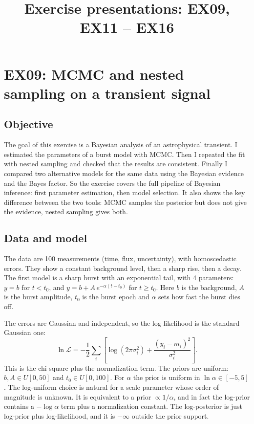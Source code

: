\documentclass[11pt]{article}
\title{Exercise presentations: EX09, EX11 -- EX16}
\author{}
\date{}
\begin{document}
\maketitle

\section{EX09: MCMC and nested sampling on a transient signal}

\subsection*{Objective}

The goal of this exercise is a Bayesian analysis of an astrophysical transient. I estimated the parameters of a burst model with MCMC. Then I repeated the fit with nested sampling and checked that the results are consistent. Finally I compared two alternative models for the same data using the Bayesian evidence and the Bayes factor. So the exercise covers the full pipeline of Bayesian inference: first parameter estimation, then model selection. It also shows the key difference between the two tools: MCMC samples the posterior but does not give the evidence, nested sampling gives both.

\subsection*{Data and model}

The data are 100 measurements (time, flux, uncertainty), with homoscedastic errors. They show a constant background level, then a sharp rise, then a decay. The first model is a sharp burst with an exponential tail, with 4 parameters: $y = b$ for $t < t_0$, and $y = b + A\,e^{-\alpha(t-t_0)}$ for $t \ge t_0$. Here $b$ is the background, $A$ is the burst amplitude, $t_0$ is the burst epoch and $\alpha$ sets how fast the burst dies off.

The errors are Gaussian and independent, so the log-likelihood is the standard Gaussian one:
\[
\ln\mathcal{L} = -\frac{1}{2}\sum_i\left[\log(2\pi\sigma_i^2) + \frac{(y_i-m_i)^2}{\sigma_i^2}\right].
\]
This is the chi square plus the normalization term. The priors are uniform: $b, A \in U[0,50]$ and $t_0 \in U[0,100]$. For $\alpha$ the prior is uniform in $\ln\alpha \in [-5,5]$. The log-uniform choice is natural for a scale parameter whose order of magnitude is unknown. It is equivalent to a prior $\propto 1/\alpha$, and in fact the log-prior contains a $-\log\alpha$ term plus a normalization constant. The log-posterior is just log-prior plus log-likelihood, and it is $-\infty$ outside the prior support.
\end{document}
